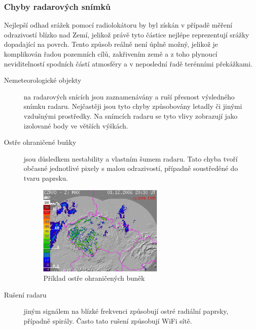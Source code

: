 \documentclass[a4paper,12pt]{article}
\begin{document}
\subsubsection*{Chyby radarových snímků}
Nejlepší odhad srážek pomocí radiolokátoru by byl získán v případě měření odrazivostí blízko nad Zemí, jelikož právě tyto částice nejlépe reprezentují srážky dopadající na povrch. Tento způsob reálně není úplně možný, jelikož  je komplikován řadou pozemních cílů, zakřivením země a z toho plynoucí neviditelností spodních částí atmosféry a v neposlední řadě terénními překážkami.
\begin{description}

\item[Nemeteorologické objekty] na radarových snících jsou zaznamenávány a ruší přesnost výsledného snímku radaru. Nejčastěji jsou tyto chyby způsobovány letadly či jinými vzdušnými prostředky. Na snímcích radaru se tyto vlivy zobrazují jako izolované body ve větších výškách.

\item[Ostře ohraničené buňky] jsou důsledkem nestability a vlastním šumem radaru. Tato chyba tvoří občasné jednotlivé pixely s malou odrazivostí, případně soustředěné do tvaru paprsku.
\begin{figure}[h!]
    \centering
    \includegraphics[width=0.6\textwidth]{./img/srazky/0612032030-gif.png}
    \caption[Ostře ohraničené buňky]{\centering Příklad ostře ohraničených buněk  \footnotemark}
\end{figure}

\item[Rušení radaru] jiným signálem na blízké frekvenci způsobují ostré radiální paprsky, případně spirály. Často tato rušení způsobují WiFi sítě.


\end{description}
\end{document}
